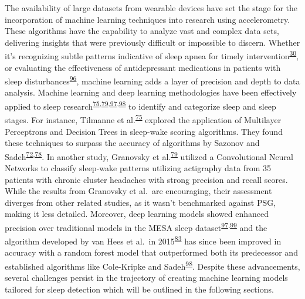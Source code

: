 \documentclass[
  10pt,
]{scrbook}
\begin{document}
The availability of large datasets from wearable devices have set the
stage for the incorporation of machine learning techniques into research
using accelerometry. These algorithms have the capability to analyze
vast and complex data sets, delivering insights that were previously
difficult or impossible to discern. Whether it's recognizing subtle
patterns indicative of sleep apnea for timely
intervention\textsuperscript{\protect\hyperlink{ref-cappuccio_sleep_2010}{30}},
or evaluating the effectiveness of antidepressant medications in
patients with sleep
disturbances\textsuperscript{\protect\hyperlink{ref-paruthi_consensus_2016}{96}},
machine learning adds a layer of precision and depth to data analysis.
Machine learning and deep learning methodologies have been effectively
applied to sleep
research\textsuperscript{\protect\hyperlink{ref-tilmanne_2009}{75},\protect\hyperlink{ref-granovsky_actigraphy-based_2018}{79},\protect\hyperlink{ref-palotti_benchmark_2019}{97},\protect\hyperlink{ref-sundararajan_sleep_2021}{98}}
to identify and categorize sleep and sleep stages. For instance,
Tilmanne et
al.\textsuperscript{\protect\hyperlink{ref-tilmanne_2009}{75}} explored
the application of Multilayer Perceptrons and Decision Trees in
sleep-wake scoring algorithms. They found these techniques to surpass
the accuracy of algorithms by Sazonov and
Sadeh\textsuperscript{\protect\hyperlink{ref-sadeh_activity-based_1994}{72},\protect\hyperlink{ref-sazonov_activity-based_2004}{78}}.
In another study, Granovsky et
al.\textsuperscript{\protect\hyperlink{ref-granovsky_actigraphy-based_2018}{79}}
utilized a Convolutional Neural Networks to classify sleep-wake patterns
utilizing actigraphy data from 35 patients with chronic cluster
headaches with strong precision and recall scores. While the results
from Granovsky et al.~are encouraging, their assessment diverges from
other related studies, as it wasn't benchmarked against PSG, making it
less detailed. Moreover, deep learning models showed enhanced precision
over traditional models in the MESA sleep
dataset\textsuperscript{\protect\hyperlink{ref-palotti_benchmark_2019}{97},\protect\hyperlink{ref-lutsey_objectively_2015}{99}}
and the algorithm developed by van Hees et al.~in
2015\textsuperscript{\protect\hyperlink{ref-hees_novel_2015}{83}} has
since been improved in accuracy with a random forest model that
outperformed both its predecessor and established algorithms like
Cole-Kripke and
Sadeh\textsuperscript{\protect\hyperlink{ref-sundararajan_sleep_2021}{98}}.
Despite these advancements, several challenges persist in the trajectory
of creating machine learning models tailored for sleep detection which
will be outlined in the following sections.
\end{document}
